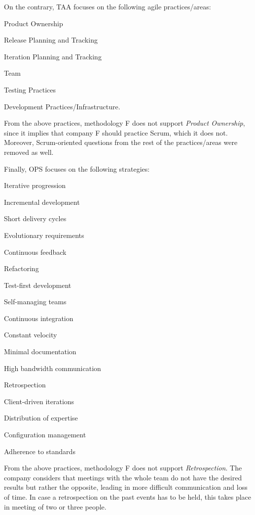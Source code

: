 On the contrary, \ac{TAA} focuses on the following agile practices/areas:
\begin{inparaenum} [a\upshape)]
	\item Product Ownership
	\item Release Planning and Tracking
	\item Iteration Planning and Tracking
	\item Team
	\item Testing Practices
	\item Development Practices/Infrastructure.
\end{inparaenum}
From the above practices, methodology F does not support \textit{Product Ownership}, since it implies that company F should practice Scrum, which it does not. Moreover, Scrum-oriented questions from the rest of the practices/areas were removed as well. 

Finally, \ac{OPS} focuses on the following strategies:
\begin{inparaenum} [a\upshape)]
	\item Iterative progression
	\item Incremental development
	\item Short delivery cycles
	\item Evolutionary requirements
	\item Continuous feedback
	\item Refactoring
	\item Test-first development
	\item Self-managing teams
	\item Continuous integration
	\item Constant velocity
	\item Minimal documentation
	\item High bandwidth communication
	\item Retrospection
	\item Client-driven iterations
	\item Distribution of expertise
	\item Configuration management
	\item Adherence to standards

\end{inparaenum}
From the above practices, methodology F does not support \textit{Retrospection}. The company considers that meetings with the whole team do not have the desired results but rather the opposite, leading in more difficult communication and loss of time. In case a retrospection on the past events has to be held, this takes place in meeting of two or three people.


